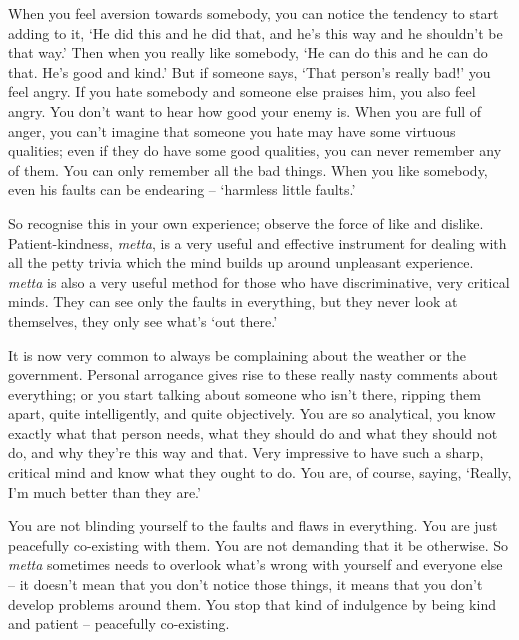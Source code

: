 When you feel aversion towards somebody, you can notice the tendency to start adding to it, `He did this and he did that, and he's this way and he shouldn't be that way.' Then when you really like somebody, `He can do this and he can do that. He's good and kind.' But if someone says, `That person's really bad!' you feel angry. If you hate somebody and someone else praises him, you also feel angry. You don't want to hear how good your enemy is. When you are full of anger, you can't imagine that someone you hate may have some virtuous qualities; even if they do have some good qualities, you can never remember any of them. You can only remember all the bad things. When you like somebody, even his faults can be endearing -- `harmless little faults.'

So recognise this in your own experience; observe the force of like and dislike. Patient-kindness, \textit{metta}, is a very useful and effective instrument for dealing with all the petty trivia which the mind builds up around unpleasant experience. \textit{metta} is also a very useful method for those who have discriminative, very critical minds. They can see only the faults in everything, but they never look at themselves, they only see what's `out there.'

It is now very common to always be complaining about the weather or the government. Personal arrogance gives rise to these really nasty comments about everything; or you start talking about someone who isn't there, ripping them apart, quite intelligently, and quite objectively. You are so analytical, you know exactly what that person needs, what they should do and what they should not do, and why they're this way and that. Very impressive to have such a sharp, critical mind and know what they ought to do. You are, of course, saying, `Really, I'm much better than they are.'

You are not blinding yourself to the faults and flaws in everything. You are just peacefully co-existing with them. You are not demanding that it be otherwise. So \textit{metta} sometimes needs to overlook what's wrong with yourself and everyone else -- it doesn't mean that you don't notice those things, it means that you don't develop problems around them. You stop that kind of indulgence by being kind and patient -- peacefully co-existing.

